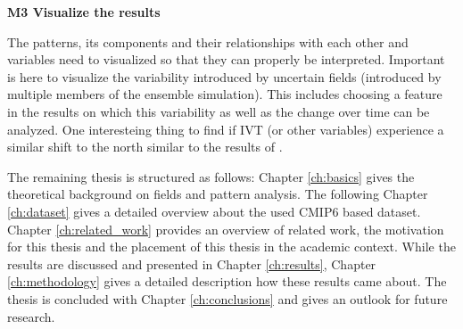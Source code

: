 \textbf{M3 Visualize the results}

The patterns, its components and their relationships with each other and variables need to visualized so that they can properly be interpreted. 
Important is here  to visualize the variability introduced by uncertain fields (introduced by multiple members of the ensemble simulation).  
This includes choosing a feature in the results on which this variability as well as the change over time can be analyzed. 
One interesteing thing to find if IVT (or other variables) experience a similar shift to the north similar to the results of .

\vspace{.3cm}
The remaining thesis is structured as follows: Chapter \ref{ch:basics} gives the theoretical background on fields and pattern analysis. 
The following Chapter \ref{ch:dataset} gives a detailed overview about the used CMIP6 based dataset. 
Chapter \ref{ch:related_work} provides an overview of related work, the motivation for this thesis and the placement of this thesis in the academic context. 
While the results are discussed and presented in Chapter \ref{ch:results}, Chapter \ref{ch:methodology} gives a detailed description how these results came about. 
The thesis is concluded with Chapter \ref{ch:conclusions} and gives an outlook for future research. 

